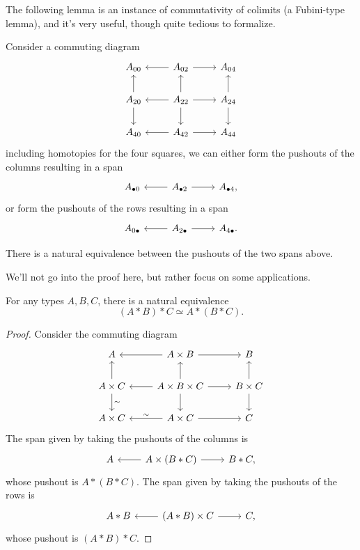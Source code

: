 \documentclass[10pt,oneside,leqno,openright]{memoir}
\begin{document}
The following lemma is an instance of commutativity of colimits (a Fubini-type lemma),
and it's very useful, though quite tedious to formalize.

Consider a commuting diagram
\[
  \begin{tikzcd}
    A_{00} & A_{02}\ar[l]\ar[r] & A_{04} \\
    A_{20}\ar[u]\ar[d] & A_{22}\ar[l]\ar[u]\ar[r]\ar[d] & A_{24}\ar[u]\ar[d] \\
    A_{40} & A_{42} \ar[l]\ar[r] & A_{44}
  \end{tikzcd}
\]
including homotopies for the four squares, we can either form the pushouts of the columns resulting in a span
\[
  \begin{tikzcd}
    A_{\bullet 0} & A_{\bullet 2}\ar[l]\ar[r] & A_{\bullet 4},
  \end{tikzcd}
\]
or form the pushouts of the rows resulting in a span
\[
  \begin{tikzcd}
    A_{0\bullet} & A_{2\bullet}\ar[l]\ar[r] & A_{4\bullet}.
  \end{tikzcd}
\]

\begin{lemma}[$3\times 3$]
  There is a natural equivalence between the pushouts of the two spans above.
\end{lemma}

We'll not go into the proof here, but rather focus on some applications.

\begin{proposition}
  For any types $A,B,C$, there is a natural equivalence
  \[(A * B) * C \simeq A * (B * C).\]
\end{proposition}
\begin{proof}
  Consider the commuting diagram
  \[
    \begin{tikzcd}
      A & A\times B\ar[l]\ar[r] & B \\
      A\times C\ar[u]\ar[d,"\sim"] & A\times B\times C\ar[l]\ar[r]\ar[u]\ar[d]
      & B\times C\ar[u]\ar[d] \\
      A\times C & A\times C\ar[l,"\sim"']\ar[r] & C
    \end{tikzcd}
  \]
  The span given by taking the pushouts of the columns is
  \[
    \begin{tikzcd}
      A & A \times (B*C) \ar[l]\ar[r] & B*C,
    \end{tikzcd}
  \]
  whose pushout is $A*(B*C)$. The span given by taking the pushouts of the rows is
  \[
    \begin{tikzcd}
      A*B & (A*B) \times C \ar[l]\ar[r] & C,
    \end{tikzcd}
  \]
  whose pushout is $(A*B)*C$.
\end{proof}
\end{document}
